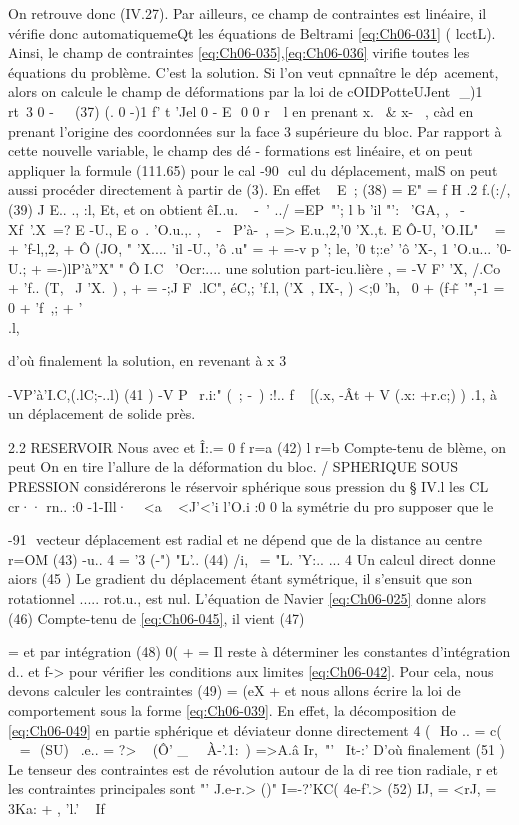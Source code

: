 {{{On retrouve donc (IV.27). Par ailleurs, ce champ de contraintes est linéaire, 
il vérifie donc automatiquemeQt les équations de Beltrami \eqref{eq:Ch06-031} ( lcctL). Ainsi, le champ de contraintes \eqref{eq:Ch06-035},\eqref{eq:Ch06-036} virifie toutes les équations du pro­blème. C'est la solution. 
Si l'on veut cpnnaître le dép~acement, alors on calcule le champ de déformations par la loi de cOIDPotteUJent 
 
_)1 rt~3 0 
-
~ 

(37) (. 
0 
-)1 f' t 'Jel 0
-
E 

0 0 r~~l 
en prenant x.~ & x-~ , càd en prenant l'origine des coordonnées sur la face
3 supérieure du bloc. Par rapport à cette nouvelle variable, le champ des dé­
-
formations est linéaire, et on peut appliquer la formule (111.65) pour le cal­
-90 ­
cul du déplacement, malS on peut aussi procéder directement à partir de (3). 
En effet 
~
E~; 
(38) 
=
E" 
=
f H 
.2 f.(:/, 
(39) 
J­
E.. ., :l, Et, 
et on obtient 
êI..u. ~ -\ ' ../
=EP~"'; 
l b
'il "':~ 
'GA, , 
~-Xf~'.X\ =? E -U., E
o~. 
'O.u.,. , 
~ -~ P'à-~, => E.u.,2,'0 'X.,t. E 
Ô-U, 
'O.IL" 
~ 
= 
+ 'f-l,,2, +
Ô (JO,
" 'X.... 
'il -U., 'ô .u" = + =-v p ';} le,
'0 t;:e' 'ô 'X-,
1 
'O.u... '0-U.; 
+ =-)lP'à''X"
" 
Ô I.C~ 'Ocr:.... 
une solution part-icu.lière 
, = -V F'} 'X, /.Co + 'f.. (T,~ J 'X.~) 
, 
+
= -;J F~.lC", éC,; 'f.l, ('X~, IX-, ) 
<;0
'h,~ 0 
+ (f\~ + '\'",-1 = 0 
+ %
'f~,; + '\\.l, 

d'où finalement la solution, en revenant à x
3 

-VP'à'I.C,(.lC;-..l) 
(41 ) 
-V P~ r.i:" (~; -~) 
:!.. f ~ [(.x, -Ât + V (.x: +r.c;) ) 
.1, à un déplacement de solide près. 

2.2 RESERVOIR 
Nous avec et
Î:.= 0 
f 
r=a 
(42) 
l 
r=b 
Compte-tenu de blème, on peut 
On en tire l'allure de la déforma­tion du bloc. 
/ 
SPHERIQUE SOUS PRESSION 
considérerons le réservoir sphérique sous pression du § IV.l les CL cr·· rn.. :0 -1-Ill· ~
<a ~ 
<J'<'i l'O.i :0 0 
la symétrie du pro­
supposer que le 


-91 ­
vecteur déplacement est radial et ne dépend que de la distance au centre r=OM 
(43) -u.. 
4 
= '3 (-") "L'.. 
(44) /i,~ = "L. 'Y:.. 
... 4 
Un calcul direct donne aiors 
(45 ) 
Le gradient du déplacement étant symétrique, il s'ensuit que son rotationnel ..... 
rot.u., est nul. L'équation de Navier \eqref{eq:Ch06-025} donne alors 
(46) 
Compte-tenu de \eqref{eq:Ch06-045}, il vient 
(47) 


= 
et par intégration 
(48) 	0( +
= 
Il reste à déterminer les constantes d'intégration d.. et f-> pour vérifier les conditions aux limites \eqref{eq:Ch06-042}. Pour cela, nous devons calculer les contraintes 
(49) 
= (eX + et nous allons écrire la loi de comportement sous la forme \eqref{eq:Ch06-039}. En effet, la décomposition de \eqref{eq:Ch06-049} en partie sphérique et déviateur donne directement 4
(  Ho .. = c( ~
= ­
(SU) 
\ .e.. = ?> ~ (Ô' _~ ~À-'.1:~) =>A.â 
Ir,~"'~ It-:' 
D'où finalement 
(51 ) 
Le tenseur des contraintes est de révolution autour de la di ree tion radiale, 
r
et les contraintes principales sont 
"' J.e-r.> ()" I=-?'KC( 4e-f'.>
(52) 	IJ, = <rJ, = 3Ka: + , ­'l.' ~ If} 

